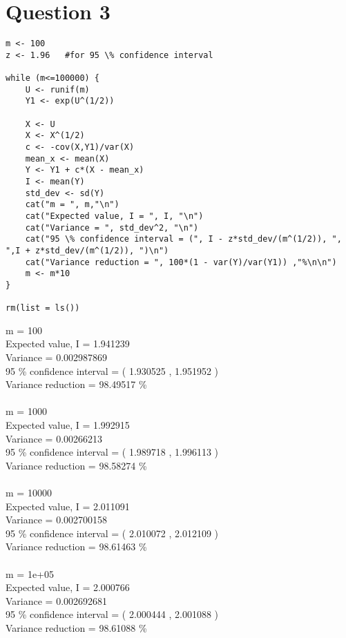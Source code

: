 \documentclass{article}
\begin{document}
\pagebreak

\section{Question 3}


\begin{lstlisting}
m <- 100
z <- 1.96	#for 95 \% confidence interval

while (m<=100000) {
	U <- runif(m)
	Y1 <- exp(U^(1/2))

	X <- U
	X <- X^(1/2)
	c <- -cov(X,Y1)/var(X)
	mean_x <- mean(X)
	Y <- Y1 + c*(X - mean_x)
	I <- mean(Y)
	std_dev <- sd(Y)
	cat("m = ", m,"\n")
	cat("Expected value, I = ", I, "\n")
	cat("Variance = ", std_dev^2, "\n")
	cat("95 \% confidence interval = (", I - z*std_dev/(m^(1/2)), ", ",I + z*std_dev/(m^(1/2)), ")\n")
	cat("Variance reduction = ", 100*(1 - var(Y)/var(Y1)) ,"%\n\n")
	m <- m*10
}

rm(list = ls())
\end{lstlisting}

m =  100 \\
Expected value, I =  1.941239 \\
Variance =  0.002987869 \\
95 \% confidence interval = ( 1.930525 ,  1.951952 )\\
Variance reduction =  98.49517 \% \\\\
m =  1000 \\
Expected value, I =  1.992915 \\
Variance =  0.00266213 \\
95 \% confidence interval = ( 1.989718 ,  1.996113 )\\
Variance reduction =  98.58274 \% \\\\
m =  10000 \\
Expected value, I =  2.011091 \\
Variance =  0.002700158 \\
95 \% confidence interval = ( 2.010072 ,  2.012109 )\\
Variance reduction =  98.61463 \% \\\\
m =  1e+05 \\
Expected value, I =  2.000766 \\
Variance =  0.002692681 \\
95 \% confidence interval = ( 2.000444 ,  2.001088 )\\
Variance reduction =  98.61088 \% \\
\end{document}
